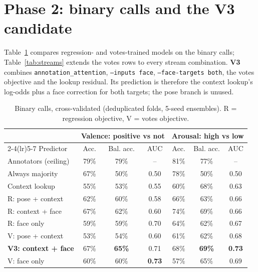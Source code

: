 \documentclass[11pt]{article}
\newcommand{\code}[1]{\texttt{#1}}
\newcommand{\best}[1]{\textbf{#1}}
\begin{document}
\section{Phase 2: binary calls and the V3 candidate}\label{sec:v3}

Table~\ref{tab:v3} compares regression- and votes-trained models on the binary calls; Table~\ref{tab:streams} extends the votes rows to every stream combination. \textbf{V3} combines \code{annotation\_attention}, \code{--inputs face}, \code{--face-targets both}, the votes objective and the lookup residual. Its prediction is therefore the context lookup's log-odds plus a face correction for both targets; the pose branch is unused.

\begin{table}[h]
\centering
\caption{Binary calls, cross-validated (deduplicated folds, 5-seed ensembles). R = regression objective, V = votes objective.}
\label{tab:v3}
\small
\begin{tabular}{lcccccc}
\toprule
 & \multicolumn{3}{c}{Valence: positive vs not} & \multicolumn{3}{c}{Arousal: high vs low} \\
\cmidrule(lr){2-4}\cmidrule(lr){5-7}
Predictor & Acc. & Bal. acc. & AUC & Acc. & Bal. acc. & AUC \\
\midrule
Annotators (ceiling) & 79\% & 79\% & -- & 81\% & 77\% & -- \\
Always majority & 67\% & 50\% & 0.50 & 78\% & 50\% & 0.50 \\
Context lookup & 55\% & 53\% & 0.55 & 60\% & 68\% & 0.63 \\
R: pose + context & 62\% & 60\% & 0.58 & 66\% & 63\% & 0.66 \\
R: context + face & 67\% & 62\% & 0.60 & 74\% & 69\% & 0.66 \\
R: face only & 59\% & 59\% & 0.70 & 64\% & 62\% & 0.67 \\
V: pose + context & 53\% & 54\% & 0.60 & 61\% & 62\% & 0.68 \\
\best{V3: context + face} & 67\% & \best{65\%} & 0.71 & 68\% & \best{69\%} & \best{0.73} \\
V: face only & 60\% & 60\% & \best{0.73} & 57\% & 65\% & 0.69 \\
\bottomrule
\end{tabular}
\end{table}
\end{document}
